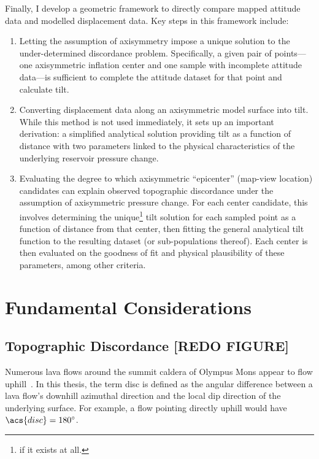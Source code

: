 Finally, I develop a geometric framework to directly compare mapped attitude data and modelled displacement data. Key steps in this framework include:
\begin{enumerate}
    \item Letting the assumption of axisymmetry impose a unique solution to the under-determined discordance problem. Specifically, a given pair of points---one axisymmetric inflation center and one sample with incomplete attitude data---is sufficient to complete the attitude dataset for that point and calculate tilt.
    \item Converting displacement data along an axisymmetric model surface into tilt. While this method is not used immediately, it sets up an important derivation: a simplified analytical solution providing tilt as a function of distance with two parameters linked to the physical characteristics of the underlying reservoir pressure change.
    \item Evaluating the degree to which axisymmetric ``epicenter'' (map-view location) candidates can explain observed topographic discordance under the assumption of axisymmetric pressure change. For each center candidate, this involves determining the unique\footnote{if it exists at all.} tilt solution for each sampled point as a function of distance from that center, then fitting the general analytical tilt function to the resulting dataset (or sub-populations thereof). Each center is then evaluated on the goodness of fit and physical plausibility of these parameters, among other criteria.
\end{enumerate}

\section{Fundamental Considerations}\label{sec:considerations}

\subsection{Topographic Discordance [REDO FIGURE]}

Numerous lava flows around the summit caldera of Olympus Mons appear to flow uphill~\parencite[Figure~\ref{fig:uphill-flows}; after][]{mouginis-mark_late-stage_2019}. In this thesis, the term \ac{disc} is defined as the angular difference between a lava flow's downhill azimuthal direction and the local dip direction of the underlying surface. For example, a flow pointing directly uphill would have $\acs{disc}=\ang{180}$. 

